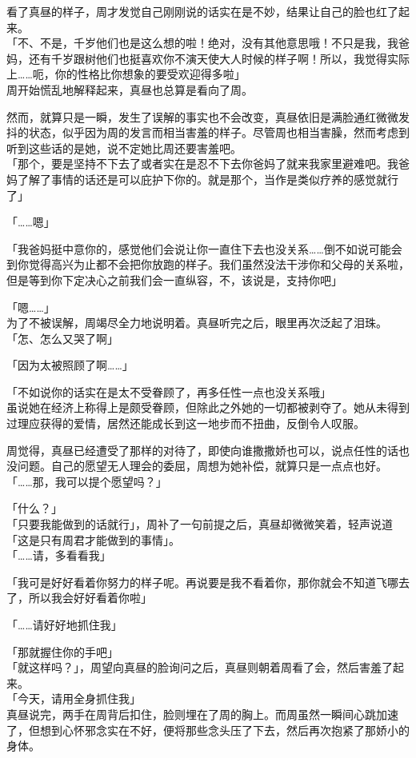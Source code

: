 看了真昼的样子，周才发觉自己刚刚说的话实在是不妙，结果让自己的脸也红了起来。\\

「不、不是，千岁他们也是这么想的啦！绝对，没有其他意思哦！不只是我，我爸妈，还有千岁跟树他们也挺喜欢你不演天使大人时候的样子啊！所以，我觉得实际上……呃，你的性格比你想象的要受欢迎得多啦」\\

周开始慌乱地解释起来，真昼也总算是看向了周。

然而，就算只是一瞬，发生了误解的事实也不会改变，真昼依旧是满脸通红微微发抖的状态，似乎因为周的发言而相当害羞的样子。尽管周也相当害臊，然而考虑到听到这些话的是她，说不定她比周还要害羞吧。\\

「那个，要是坚持不下去了或者实在是忍不下去你爸妈了就来我家里避难吧。我爸妈了解了事情的话还是可以庇护下你的。就是那个，当作是类似疗养的感觉就行了」

「……嗯」

「我爸妈挺中意你的，感觉他们会说让你一直住下去也没关系……倒不如说可能会到你觉得高兴为止都不会把你放跑的样子。我们虽然没法干涉你和父母的关系啦，但是等到你下定决心之前我们会一直纵容，不，该说是，支持你吧」

「嗯……」\\

为了不被误解，周竭尽全力地说明着。真昼听完之后，眼里再次泛起了泪珠。\\

「怎、怎么又哭了啊」

「因为太被照顾了啊……」

「不如说你的话实在是太不受眷顾了，再多任性一点也没关系哦」\\

虽说她在经济上称得上是颇受眷顾，但除此之外她的一切都被剥夺了。她从未得到过理应获得的爱情，居然还能成长到这一地步而不扭曲，反倒令人叹服。

周觉得，真昼已经遭受了那样的对待了，即使向谁撒撒娇也可以，说点任性的话也没问题。自己的愿望无人理会的委屈，周想为她补偿，就算只是一点点也好。\\

「……那，我可以提个愿望吗？」

「什么？」\\

「只要我能做到的话就行」，周补了一句前提之后，真昼却微微笑着，轻声说道「这是只有周君才能做到的事情」。\\

「……请，多看看我」

「我可是好好看着你努力的样子呢。再说要是我不看着你，那你就会不知道飞哪去了，所以我会好好看着你啦」

「……请好好地抓住我」

「那就握住你的手吧」\\

「就这样吗？」，周望向真昼的脸询问之后，真昼则朝着周看了会，然后害羞了起来。\\

「今天，请用全身抓住我」\\

真昼说完，两手在周背后扣住，脸则埋在了周的胸上。而周虽然一瞬间心跳加速了，但想到心怀邪念实在不好，便将那些念头压了下去，然后再次抱紧了那娇小的身体。
